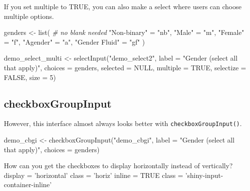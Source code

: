 \documentclass[
  oneside]{book}
\newenvironment{Shaded}{\begin{snugshade}}{\end{snugshade}}
\newcommand{\AttributeTok}[1]{\textcolor[rgb]{0.77,0.63,0.00}{#1}}
\newcommand{\CommentTok}[1]{\textcolor[rgb]{0.56,0.35,0.01}{\textit{#1}}}
\newcommand{\ConstantTok}[1]{\textcolor[rgb]{0.00,0.00,0.00}{#1}}
\newcommand{\DecValTok}[1]{\textcolor[rgb]{0.00,0.00,0.81}{#1}}
\newcommand{\FunctionTok}[1]{\textcolor[rgb]{0.00,0.00,0.00}{#1}}
\newcommand{\NormalTok}[1]{#1}
\newcommand{\OtherTok}[1]{\textcolor[rgb]{0.56,0.35,0.01}{#1}}
\newcommand{\StringTok}[1]{\textcolor[rgb]{0.31,0.60,0.02}{#1}}
\begin{document}
If you set \AttributeTok{multiple} to \ConstantTok{TRUE}, you can also make a select where users can choose multiple options.

\begin{Shaded}
\begin{Highlighting}[]
\NormalTok{genders }\OtherTok{\textless{}{-}} \FunctionTok{list}\NormalTok{( }\CommentTok{\# no blank needed}
  \StringTok{"Non{-}binary"} \OtherTok{=} \StringTok{"nb"}\NormalTok{,}
  \StringTok{"Male"} \OtherTok{=} \StringTok{"m"}\NormalTok{,}
  \StringTok{"Female"} \OtherTok{=} \StringTok{"f"}\NormalTok{,}
  \StringTok{"Agender"} \OtherTok{=} \StringTok{"a"}\NormalTok{,}
  \StringTok{"Gender Fluid"} \OtherTok{=} \StringTok{"gf"}
\NormalTok{)}

\NormalTok{demo\_select\_multi }\OtherTok{\textless{}{-}} 
  \FunctionTok{selectInput}\NormalTok{(}\StringTok{"demo\_select2"}\NormalTok{, }
              \AttributeTok{label =} \StringTok{"Gender (select all that apply)"}\NormalTok{, }
              \AttributeTok{choices =}\NormalTok{ genders,}
              \AttributeTok{selected =} \ConstantTok{NULL}\NormalTok{,}
              \AttributeTok{multiple =} \ConstantTok{TRUE}\NormalTok{, }
              \AttributeTok{selectize =} \ConstantTok{FALSE}\NormalTok{,}
              \AttributeTok{size =} \DecValTok{5}\NormalTok{)}
\end{Highlighting}
\end{Shaded}

\hypertarget{checkboxgroupinput}{%
\subsection{checkboxGroupInput}\label{checkboxgroupinput}}

However, this interface almost always looks better with \texttt{checkboxGroupInput}\texttt{()}.

\begin{Shaded}
\begin{Highlighting}[]
\NormalTok{demo\_cbgi }\OtherTok{\textless{}{-}}
  \FunctionTok{checkboxGroupInput}\NormalTok{(}\StringTok{"demo\_cbgi"}\NormalTok{,}
                     \AttributeTok{label =} \StringTok{"Gender (select all that apply)"}\NormalTok{,}
                     \AttributeTok{choices =}\NormalTok{ genders)}
\end{Highlighting}
\end{Shaded}

How can you get the checkboxes to display horizontally instead of vertically?\\
display = 'horizontal' class = 'horiz' inline = TRUE class = 'shiny-input-container-inline'
\end{document}
